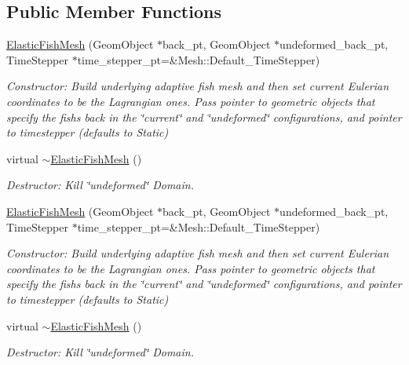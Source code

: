 \subsection*{Public Member Functions}
\begin{DoxyCompactItemize}
\item 
\hyperlink{classElasticFishMesh_a76c4d63d48b9ee48c3742e55057cfba0}{Elastic\+Fish\+Mesh} (Geom\+Object $\ast$back\+\_\+pt, Geom\+Object $\ast$undeformed\+\_\+back\+\_\+pt, Time\+Stepper $\ast$time\+\_\+stepper\+\_\+pt=\&Mesh\+::\+Default\+\_\+\+Time\+Stepper)
\begin{DoxyCompactList}\small\item\em Constructor\+: Build underlying adaptive fish mesh and then set current Eulerian coordinates to be the Lagrangian ones. Pass pointer to geometric objects that specify the fish\textquotesingle{}s back in the \char`\"{}current\char`\"{} and \char`\"{}undeformed\char`\"{} configurations, and pointer to timestepper (defaults to Static) \end{DoxyCompactList}\item 
virtual \hyperlink{classElasticFishMesh_ab8e084bb7551b9765b95dc38e82ab1be}{$\sim$\+Elastic\+Fish\+Mesh} ()
\begin{DoxyCompactList}\small\item\em Destructor\+: Kill \char`\"{}undeformed\char`\"{} Domain. \end{DoxyCompactList}\item 
\hyperlink{classElasticFishMesh_a76c4d63d48b9ee48c3742e55057cfba0}{Elastic\+Fish\+Mesh} (Geom\+Object $\ast$back\+\_\+pt, Geom\+Object $\ast$undeformed\+\_\+back\+\_\+pt, Time\+Stepper $\ast$time\+\_\+stepper\+\_\+pt=\&Mesh\+::\+Default\+\_\+\+Time\+Stepper)
\begin{DoxyCompactList}\small\item\em Constructor\+: Build underlying adaptive fish mesh and then set current Eulerian coordinates to be the Lagrangian ones. Pass pointer to geometric objects that specify the fish\textquotesingle{}s back in the \char`\"{}current\char`\"{} and \char`\"{}undeformed\char`\"{} configurations, and pointer to timestepper (defaults to Static) \end{DoxyCompactList}\item 
virtual \hyperlink{classElasticFishMesh_ab8e084bb7551b9765b95dc38e82ab1be}{$\sim$\+Elastic\+Fish\+Mesh} ()
\begin{DoxyCompactList}\small\item\em Destructor\+: Kill \char`\"{}undeformed\char`\"{} Domain. \end{DoxyCompactList}\end{DoxyCompactItemize}
